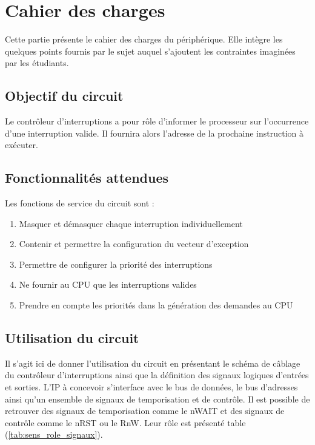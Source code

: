 \section{Cahier des charges}
Cette partie présente le cahier des charges du périphérique.
Elle intègre les quelques points fournis par le sujet auquel s'ajoutent les contraintes imaginées par les étudiants.
\subsection{Objectif du circuit}
Le contrôleur d'interruptions a pour rôle d'informer le processeur sur l’occurrence d'une interruption valide.
Il fournira alors l’adresse de la prochaine instruction à exécuter.

\subsection{Fonctionnalités attendues}
Les fonctions de service du circuit sont :
\begin{enumerate}
    \item Masquer et démasquer chaque interruption individuellement
    \item Contenir et permettre la configuration du vecteur d'exception
    \item Permettre de configurer la priorité des interruptions
    \item Ne fournir au \gls{CPU} que les interruptions valides
    \item Prendre en compte les priorités dans la génération des demandes au \gls{CPU}
\end{enumerate}
\subsection{Utilisation du circuit}
	
Il s'agit ici de donner l'utilisation du circuit en présentant le schéma de câblage du contrôleur d'interruptions ainsi que la définition des signaux logiques d'entrées et sorties.
L'\gls{IP} à concevoir s'interface avec le bus de données, le bus d'adresses ainsi qu'un ensemble de signaux de temporisation et de contrôle.
Il est possible de retrouver des signaux de temporisation comme le nWAIT et des signaux de contrôle comme le nRST ou le RnW.
Leur rôle est présenté table (\ref{tab:sens_role_signaux}).
	
